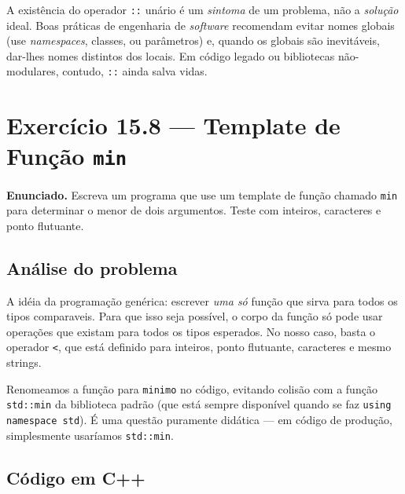 \documentclass[11pt,a4paper]{article}
\begin{document}
\begin{obseng}
A exist\^encia do operador \texttt{::} un\'ario \'e um \emph{sintoma} de um problema, n\~ao a \emph{solu\c{c}\~ao} ideal. Boas pr\'aticas de engenharia de \emph{software} recomendam evitar nomes globais (use \emph{namespaces}, classes, ou par\^ametros) e, quando os globais s\~ao inevit\'aveis, dar-lhes nomes distintos dos locais. Em c\'odigo legado ou bibliotecas n\~ao-modulares, contudo, \texttt{::} ainda salva vidas.
\end{obseng}

\section{Exerc\'icio 15.8 --- Template de Fun\c{c}\~ao \texttt{min}}

\begin{enunciado}
\textbf{Enunciado.} Escreva um programa que use um template de fun\c{c}\~ao chamado \texttt{min} para determinar o menor de dois argumentos. Teste com inteiros, caracteres e ponto flutuante.
\end{enunciado}

\subsection*{An\'alise do problema}

A id\'eia da programa\c{c}\~ao gen\'erica: escrever \emph{uma s\'o} fun\c{c}\~ao que sirva para todos os tipos comparaveis. Para que isso seja poss\'ivel, o corpo da fun\c{c}\~ao s\'o pode usar opera\c{c}\~oes que existam para todos os tipos esperados. No nosso caso, basta o operador \texttt{<}, que est\'a definido para inteiros, ponto flutuante, caracteres e mesmo strings.

\begin{obseng}
Renomeamos a fun\c{c}\~ao para \texttt{minimo} no c\'odigo, evitando colis\~ao com a fun\c{c}\~ao \texttt{std::min} da biblioteca padr\~ao (que est\'a sempre dispon\'ivel quando se faz \texttt{using namespace std}). \'E uma quest\~ao puramente did\'atica --- em c\'odigo de produ\c{c}\~ao, simplesmente usar\'iamos \texttt{std::min}.
\end{obseng}

\subsection*{C\'odigo em C++}
\end{document}
